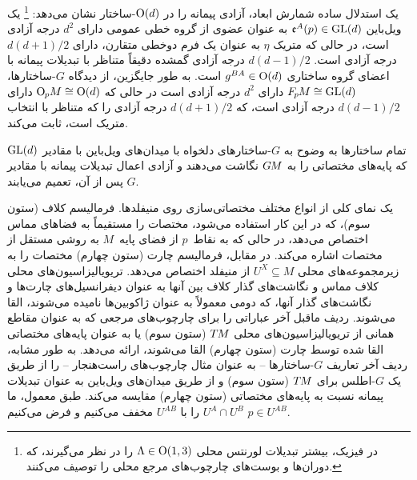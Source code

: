 یک استدلال ساده شمارش ابعاد، آزادی پیمانه را در $\operatorname{O}(d)$-ساختار نشان می‌دهد:%
\footnote{
	در فیزیک، بیشتر تبدیلات لورنتس محلی $\Lambda \in \operatorname{O}(1,3)$ را در نظر می‌گیرند، که دوران‌ها و بوست‌های چارچوب‌های مرجع محلی را توصیف می‌کنند.
}
یک ویل‌باین $\mathfrak{e}^A(p) \in \operatorname{GL}(d)$ به عنوان عضوی از گروه خطی عمومی دارای $d^2$ درجه آزادی است، در حالی که متریک $\eta$ به عنوان یک فرم دوخطی متقارن، دارای $d(d+1)/2$ درجه آزادی است.
$d(d-1)/2$ درجه آزادی گمشده دقیقاً متناظر با تبدیلات پیمانه با اعضای گروه ساختاری $g^{BA} \in \operatorname{O}(d)$ است.
به طور جایگزین، از دیدگاه $G$-ساختارها، $F_{\mkern-1.5mu p}\mkern-1.0muM \cong \operatorname{GL}(d)$ دارای $d^2$ درجه آزادی است در حالی که $\operatorname{O}_{\mkern-1.1mu p}\mkern-3.4muM \cong \operatorname{O}(d)$ دارای $d(d-1)/2$ درجه آزادی است، که $d(d+1)/2$ درجه آزادی را که متناظر با انتخاب متریک است، ثابت می‌کند.


تمام ساختارها به وضوح به $G$-ساختارهای دلخواه با میدان‌های ویل‌باین با مقادیر $\operatorname{GL}(d)$ که پایه‌های مختصاتی را به $G\mkern-1.4muM$ نگاشت می‌دهند و آزادی اعمال تبدیلات پیمانه با مقادیر $G$ پس از آن، تعمیم می‌یابند.



\begin{landscape}
	\begin{table}[h!]
		\vspace*{8ex}
		\centering%
		\scalebox{1.}{%
			
		}%
		\vspace*{4ex}%
		\captionsetup{width=.9\linewidth}
		\caption{
			یک نمای کلی از انواع مختلف مختصاتی‌سازی روی منیفلدها.
			فرمالیسم کلاف (ستون سوم)، که در این کار استفاده می‌شود، مختصات را مستقیماً به فضاهای مماس اختصاص می‌دهد، در حالی که به نقاط~$p$ از فضای پایه~$M$ به روشی مستقل از مختصات اشاره می‌کند.
			در مقابل، فرمالیسم چارت (ستون چهارم) مختصات را به زیرمجموعه‌های محلی $U^X \subseteq M$ از منیفلد اختصاص می‌دهد.
			تریویالیزاسیون‌های محلی کلاف مماس و نگاشت‌های گذار کلاف بین آنها به عنوان دیفرانسیل‌های چارت‌ها و نگاشت‌های گذار آنها، که دومی معمولاً به عنوان ژاکوبین‌ها نامیده می‌شوند، القا می‌شوند.
			ردیف ماقبل آخر عباراتی را برای چارچوب‌های مرجعی که به عنوان مقاطع همانی از تریویالیزاسیون‌های محلی $T\mkern-1.5muM$ (ستون سوم) یا به عنوان پایه‌های مختصاتی القا شده توسط چارت (ستون چهارم) القا می‌شوند، ارائه می‌دهد.
			به طور مشابه، ردیف آخر تعاریف $G$-ساختارها -- به عنوان مثال چارچوب‌های راست‌هنجار -- را از طریق یک $G$-اطلس برای $T\mkern-1.5muM$ (ستون سوم) و از طریق میدان‌های ویل‌باین به عنوان تبدیلات پیمانه نسبت به پایه‌های مختصاتی (ستون چهارم) مقایسه می‌کند.
			طبق معمول، ما $U^A \cap U^B$ را با $U^{AB}$ مخفف می‌کنیم و فرض می‌کنیم $p\in U^{AB}$.
		}
		\label{tab:coord_charts_gauge_trafos}
	\end{table}
\end{landscape}